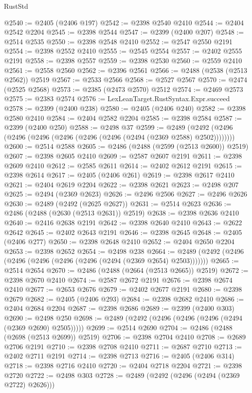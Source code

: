 \begin{lexlean}{RustStd}
\begin{coremodule}
@2540 := @2405 (@2406 @197)
@2542 := @2398 @2540 @2410
@2544 := @2404 @2542 @2204
@2545 := @2398 @2544
@2547 := @2399 (@2400 @207)
@2548 := @2514 @2535
@2550 := @2398 @2548 @2410
@2552 := @2547 @2550 @2191
@2554 := @2398 @2552 @2410
@2555 := @2545 @2554
@2557 := @2402 @2555 @2191
@2558 := @2398 @2557
@2559 := @2398 @2530
@2560 := @2559 @2410
@2561 := @2558 @2560
@2562 := @2396 @2561
@2566 := @2488 (@2538 (@2513 @2562)) @2519
@2567 := @2533 @2566
@2568 := @2527 @2567
@2570 := @2474 (@2525 @2568)
@2573 := @2385 (@2473 @2570) @2512
@2574 := @2469 @2573
@2575 := @2383 @2574
@2576 := LexLeanTarget.RustSyntax.Expr.succeed
@2578 := @2399 (@2400 @238)
@2580 := @2405 (@2406 @240)
@2582 := @2398 @2580 @2410
@2584 := @2404 @2582 @2204
@2585 := @2398 @2584
@2587 := @2399 (@2400 @250)
@2588 := @2498 @37
@2599 := @2489 (@2492 (@2496 (@2496 (@2496 (@2496 (@2496 (@2496 (@2494 (@2369 @2588) @2502))))))))
@2600 := @2514 @2588
@2605 := @2486 (@2488 (@2599 (@2513 @2600)) @2519)
@2607 := @2398 @2605 @2410
@2609 := @2587 @2607 @2191
@2611 := @2398 @2609 @2410
@2612 := @2585 @2611
@2614 := @2402 @2612 @2191
@2615 := @2398 @2614
@2617 := @2405 (@2406 @261)
@2619 := @2398 @2617 @2410
@2621 := @2404 @2619 @2204
@2622 := @2398 @2621
@2623 := @2498 @207
@2625 := @2494 (@2369 @2623)
@2626 := @2496 @2506
@2627 := @2496 @2626
@2630 := @2489 (@2492 (@2625 @2627))
@2631 := @2514 @2623
@2636 := @2486 (@2488 (@2630 (@2513 @2631)) @2519)
@2638 := @2398 @2636 @2410
@2640 := @2416 @2638 @2191
@2642 := @2398 @2640 @2410
@2643 := @2622 @2642
@2645 := @2402 @2643 @2191
@2646 := @2398 @2645
@2648 := @2405 (@2406 @277)
@2650 := @2398 @2648 @2410
@2652 := @2404 @2650 @2204
@2653 := @2398 @2652
@2654 := @2498 @238
@2664 := @2489 (@2492 (@2496 (@2496 (@2496 (@2496 (@2496 (@2494 (@2369 @2654) @2503)))))))
@2665 := @2514 @2654
@2670 := @2486 (@2488 (@2664 (@2513 @2665)) @2519)
@2672 := @2398 @2670 @2410
@2674 := @2587 @2672 @2191
@2676 := @2398 @2674 @2410
@2677 := @2653 @2676
@2679 := @2402 @2677 @2191
@2680 := @2398 @2679
@2682 := @2405 (@2406 @293)
@2684 := @2398 @2682 @2410
@2686 := @2404 @2684 @2204
@2687 := @2398 @2686
@2689 := @2399 (@2400 @303)
@2690 := @2498 @250
@2698 := @2489 (@2492 (@2496 (@2496 (@2496 (@2494 (@2369 @2690) @2505)))))
@2699 := @2514 @2690
@2704 := @2486 (@2488 (@2698 (@2513 @2699)) @2519)
@2706 := @2398 @2704 @2410
@2708 := @2689 @2706 @2191
@2710 := @2398 @2708 @2410
@2711 := @2687 @2710
@2713 := @2402 @2711 @2191
@2714 := @2398 @2713
@2716 := @2405 (@2406 @314)
@2718 := @2398 @2716 @2410
@2720 := @2404 @2718 @2204
@2721 := @2398 @2720
@2722 := @2498 @303
@2728 := @2489 (@2492 (@2496 (@2494 (@2369 @2722) @2626)))

\end{coremodule}
\end{lexlean}
